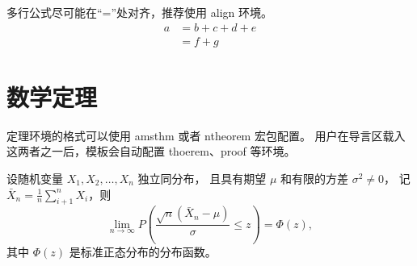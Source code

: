 多行公式尽可能在“=”处对齐，推荐使用 {align} 环境。
\begin{align}
  a & = b + c + d + e \\
    & = f + g
\end{align}



\section{数学定理}

定理环境的格式可以使用 {amsthm} 或者 {ntheorem} 宏包配置。
用户在导言区载入这两者之一后，模板会自动配置 {thoerem}、{proof} 等环境。

\begin{theorem}
  设随机变量 $X_1, X_2, \dots, X_n$ 独立同分布， 且具有期望 $\mu$ 和有限的方差 $\sigma^2 \ne 0$，
  记 $\bar{X}_n = \frac{1}{n} \sum_{i+1}^n X_i$，则
  \begin{equation}
    \lim_{n \to \infty} P \left(\frac{\sqrt{n} \left( \bar{X}_n - \mu \right)}{\sigma} \le z \right) = \Phi(z),
  \end{equation}
  其中 $\Phi(z)$ 是标准正态分布的分布函数。
\end{theorem}

